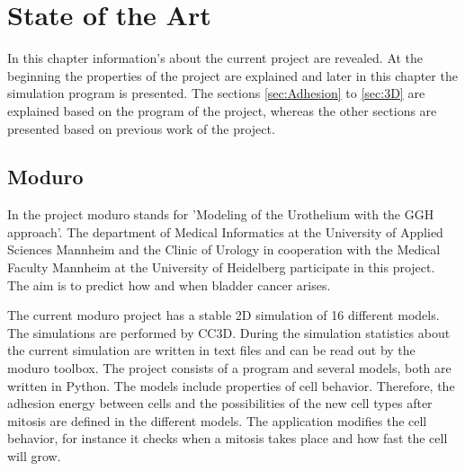 \chapter{State of the Art}
In this chapter information’s about the current project are revealed. At the beginning the properties of the project are explained and later in this chapter the simulation program is presented. The sections \ref{sec:Adhesion} to \ref{sec:3D} are explained based on the program of the project, whereas the other sections are presented based on previous work of the project.

\section{Moduro}
In the project moduro stands for 'Modeling of the Urothelium with the \ac{GGH} approach'. The department of Medical Informatics at the University of Applied Sciences Mannheim and the Clinic of Urology in cooperation with the Medical Faculty Mannheim at the University of Heidelberg participate in this project. The aim is to predict how and when bladder cancer arises.

The current moduro project has a stable 2D simulation of 16 different models. The simulations are performed by \ac{CC3D}. During the simulation statistics about the current simulation are written in text files and can be read out by the moduro toolbox. \newline
The project consists of a program and several models, both are written in Python. The models include properties of cell behavior. Therefore, the adhesion energy between cells and the possibilities of the new cell types after mitosis are defined in the different models. The application modifies the cell behavior, for instance it checks when a mitosis takes place and how fast the cell will grow.


